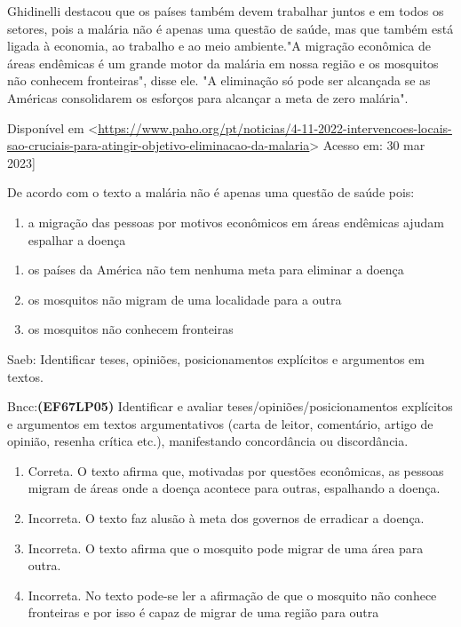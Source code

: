 Ghidinelli destacou que os países também devem trabalhar juntos e em
todos os setores, pois a malária não é apenas uma questão de saúde, mas
que também está ligada à economia, ao trabalho e ao meio ambiente."A
migração econômica de áreas endêmicas é um grande motor da malária em
nossa região e os mosquitos não conhecem fronteiras", disse ele. "A
eliminação só pode ser alcançada se as Américas consolidarem os esforços
para alcançar a meta de zero malária".

Disponível em
\textless{}\href{https://www.paho.org/pt/noticias/4-11-2022-intervencoes-locais-sao-cruciais-para-atingir-objetivo-eliminacao-da-malaria}{\uline{https://www.paho.org/pt/noticias/4-11-2022-intervencoes-locais-sao-cruciais-para-atingir-objetivo-eliminacao-da-malaria}}\textgreater{}
Acesso em: 30 mar 2023{]}

De acordo com o texto a malária não é apenas uma questão de saúde pois:

\begin{enumerate}
\def\labelenumi{\alph{enumi})}
\tightlist
\item
  a migração das pessoas por motivos econômicos em áreas endêmicas
  ajudam espalhar a doença
\end{enumerate}

\begin{enumerate}
\def\labelenumi{\alph{enumi})}
\item
  os países da América não tem nenhuma meta para eliminar a doença
\item
  os mosquitos não migram de uma localidade para a outra
\item
  os mosquitos não conhecem fronteiras
\end{enumerate}

Saeb: Identificar teses, opiniões, posicionamentos explícitos e
argumentos em textos.

Bncc:\textbf{(EF67LP05)} Identificar e avaliar
teses/opiniões/posicionamentos explícitos e argumentos em textos
argumentativos (carta de leitor, comentário, artigo de opinião, resenha
crítica etc.), manifestando concordância ou discordância.

\begin{enumerate}
\def\labelenumi{\arabic{enumi}.}
\item
  Correta. O texto afirma que, motivadas por questões econômicas, as
  pessoas migram de áreas onde a doença acontece para outras, espalhando
  a doença.
\item
  Incorreta. O texto faz alusão à meta dos governos de erradicar a
  doença.
\item
  Incorreta. O texto afirma que o mosquito pode migrar de uma área para
  outra.
\item
  Incorreta. No texto pode-se ler a afirmação de que o mosquito não
  conhece fronteiras e por isso é capaz de migrar de uma região para
  outra
\end{enumerate}

